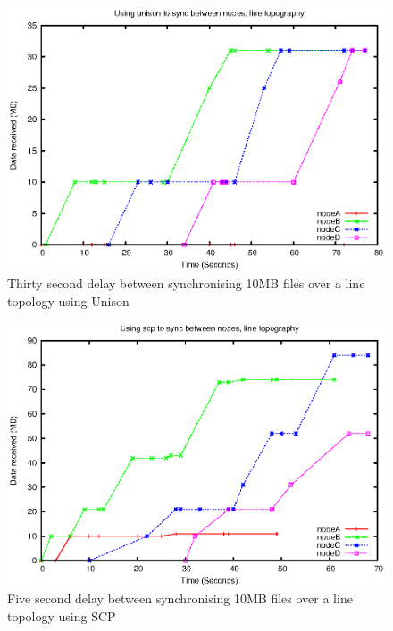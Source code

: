 \documentclass[12pt]{article}
\begin{document}
\begin{figure}[hb!]
\centering
\includegraphics[height=0.4\textheight]{images/line-uni-10-30.eps}
\caption{Thirty second delay between synchronising 10MB files over a line topology
using Unison}
\label{fig:line_uni_10_30}
\end{figure}
\newpage

\begin{figure}[ht!]
\centering
\includegraphics[height=0.4\textheight]{images/line-scp-10-5.eps}
\caption{Five second delay between synchronising 10MB files over a line topology
using SCP}
\label{fig:line_scp_10_5}
\end{figure}
\end{document}
